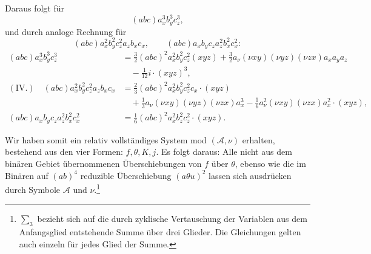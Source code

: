 \documentclass[11pt]{article}
\newcommand{\A}{\mathcal A}
\begin{document}
Daraus folgt für
\[
(abc)a_x^3b_y^3c_z^3,
\]
und durch analoge Rechnung für
\[
(abc)a_x^2b_y^2c_z^2a_zb_xc_x,\qquad
(abc)a_xb_yc_za_z^2b_x^2c_x^2:
\]
\[
\begin{aligned}
(abc)a_x^3b_y^3c_z^3
&=\frac32(abc)^2a_x^2b_y^2c_z^2(xyz)
+\frac32 a_\nu(\nu xy)(\nu yz)(\nu zx)a_xa_ya_z\\
&\quad-\frac1{12}i\cdot(xyz)^3,\\[0.4em]
(\text{IV.})\quad
(abc)a_x^2b_y^2c_z^2a_zb_xc_x
&=\frac23(abc)^2a_x^2b_y^2c_z^2c_x\cdot(xyz)\\
&\quad+\frac13a_\nu(\nu xy)(\nu yz)(\nu zx)a_x^3
-\frac16 a_\nu^2(\nu xy)(\nu zx)a_x^2\cdot(xyz),\\[0.4em]
(abc)a_xb_yc_za_z^2b_x^2c_x^2
&=\frac16(abc)^2a_x^2b_z^2c_z^2\cdot(xyz).
\end{aligned}
\]

Wir haben somit ein relativ vollständiges System mod $(\A,\nu)$ erhalten, bestehend aus den vier Formen: $f,\theta,K,j$. Es folgt daraus: Alle nicht aus dem binären Gebiet übernommenen Überschiebungen von $f$ über $\theta$, ebenso wie die im Binären auf $(ab)^4$ reduzible Überschiebung $(a\theta u)^2$ lassen sich ausdrücken durch Symbole $\A$ und $\nu$.\footnote{$\sum_3$ bezieht sich auf die durch zyklische Vertauschung der Variablen aus dem Anfangsglied entstehende Summe über drei Glieder. Die Gleichungen gelten auch einzeln für jedes Glied der Summe.}
\end{document}
